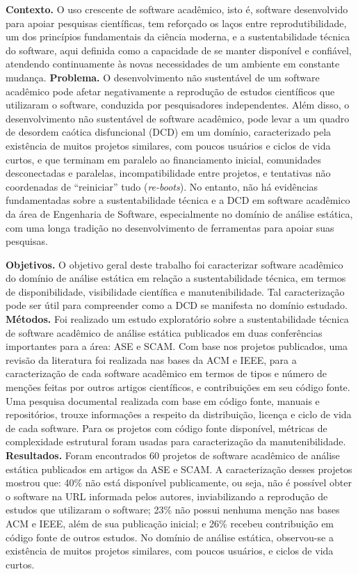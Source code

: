\textbf{Contexto.}
O uso crescente de software acadêmico, isto é,
software desenvolvido para apoiar pesquisas científicas,
tem reforçado os laços entre
reprodutibilidade, um dos princípios fundamentais da ciência moderna,
e a sustentabilidade técnica do software,
aqui definida como a capacidade de se manter disponível e confiável,
atendendo continuamente às novas necessidades de um ambiente em constante
mudança.
%
\textbf{Problema.}
O desenvolvimento não sustentável de um software acadêmico pode
afetar negativamente a reprodução de estudos científicos que utilizaram o
software,
conduzida por pesquisadores independentes.
Além disso, o desenvolvimento não sustentável de software acadêmico,
pode levar a um quadro de desordem caótica disfuncional (DCD) em um domínio,
caracterizado pela existência de muitos projetos similares, com poucos
usuários e ciclos de vida curtos, e que terminam em paralelo ao
financiamento
inicial,  comunidades desconectadas e paralelas, incompatibilidade entre
projetos, e tentativas não coordenadas de ``reiniciar'' tudo
({\it re-boots}).
%
No entanto, não há evidências fundamentadas sobre a sustentabilidade técnica
e a DCD em software acadêmico da área de Engenharia de Software,
especialmente
no domínio de análise estática, com uma longa tradição no
desenvolvimento de ferramentas para apoiar suas pesquisas.

\textbf{Objetivos.}
O objetivo geral deste trabalho foi
caracterizar software acadêmico do domínio de análise estática
em relação a sustentabilidade técnica,
em termos de disponibilidade, visibilidade científica e manutenibilidade.
Tal caracterização pode ser útil para compreender como a DCD se manifesta
no domínio estudado.
%
\textbf{Métodos.}
Foi realizado um estudo exploratório sobre a sustentabilidade
técnica de software acadêmico de análise estática
publicados em duas conferências importantes para a área: ASE e SCAM.
%
Com base nos projetos publicados,
uma revisão da literatura foi realizada nas bases da ACM e IEEE,
para a caracterização de cada software acadêmico
em termos de tipos e número de menções feitas por outros artigos
científicos,
e contribuições em seu código fonte.
Uma pesquisa documental realizada com base em
código fonte, manuais e repositórios, trouxe informações a respeito da
distribuição, licença e ciclo de vida de cada software.
Para os projetos com código fonte disponível, métricas de
complexidade estrutural foram usadas para caracterização da
manutenibilidade.
%
\textbf{Resultados.}
Foram encontrados 60 projetos de software acadêmico de análise estática
publicados em artigos da ASE e SCAM.
%
A caracterização desses projetos mostrou que:
40\% não está disponível publicamente, ou seja,
não é possível obter o software na URL informada pelos autores,
inviabilizando a reprodução de estudos que utilizaram o software;
%
23\% não possui nenhuma menção nas bases ACM e IEEE, além de sua publicação
inicial; e
26\% recebeu contribuição em código fonte de outros estudos.
No domínio de análise estática, observou-se a existência de muitos projetos
similares, com poucos usuários, e ciclos de vida curtos.

